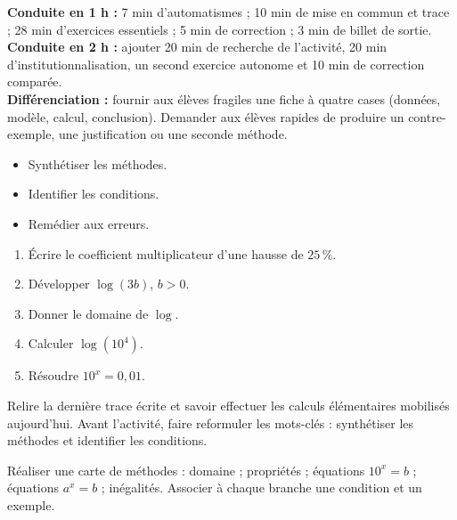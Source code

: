 \ifprof
\begin{methode}
\textbf{Conduite en 1 h :} 7 min d'automatismes ; 10 min de mise en commun et trace ; 28 min d'exercices essentiels ; 5 min de correction ; 3 min de billet de sortie.\\
\textbf{Conduite en 2 h :} ajouter 20 min de recherche de l'activité, 20 min d'institutionnalisation, un second exercice autonome et 10 min de correction comparée.\\
\textbf{Différenciation :} fournir aux élèves fragiles une fiche à quatre cases (données, modèle, calcul, conclusion). Demander aux élèves rapides de produire un contre-exemple, une justification ou une seconde méthode.
\end{methode}
\fi
{}
\begin{objectifs}\begin{itemize}\item Synthétiser les méthodes.\item Identifier les conditions.\item Remédier aux erreurs.\end{itemize}\end{objectifs}
\begin{automatismes}\begin{enumerate}\item Écrire le coefficient multiplicateur d'une hausse de $25\,\%$. \item Développer $\log(3b)$, $b>0$. \item Donner le domaine de $\log$. \rep{$]0,+\infty[$}\item Calculer $\log(10^4)$. \item Résoudre $10^x=0{,}01$. \end{enumerate}\end{automatismes}
\begin{prerequis}Relire la dernière trace écrite et savoir effectuer les calculs élémentaires mobilisés aujourd'hui. Avant l'activité, faire reformuler les mots-clés : synthétiser les méthodes et identifier les conditions.\end{prerequis}

\begin{activite}
Réaliser une carte de méthodes : domaine ; propriétés ; équations $10^x=b$ ; équations $a^x=b$ ; inégalités. Associer à chaque branche une condition et un exemple.

\end{activite}

